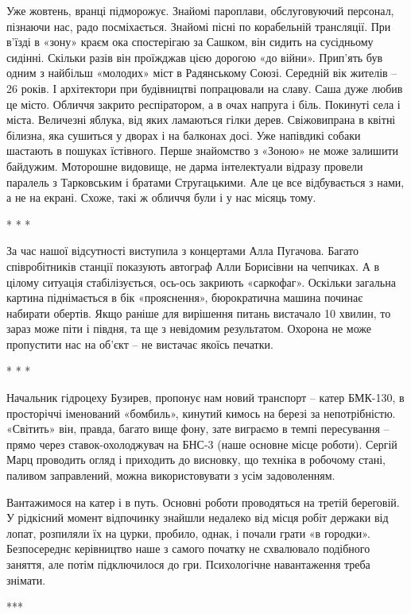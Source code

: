Уже жовтень, вранці підморожує. Знайомі пароплави, обслуговуючий персонал,
пізнаючи нас, радо посміхається. Знайомі пісні по корабельній трансляції. При
в'їзді в «зону» краєм ока спостерігаю за Сашком, він сидить на сусідньому
сидінні. Скільки разів він проїжджав цією дорогою «до війни». Прип'ять був
одним з найбільш «молодих» міст в Радянському Союзі. Середній вік жителів – 26
років. І архітектори при будівництві попрацювали на славу. Саша дуже любив це
місто. Обличчя закрито респіратором, а в очах напруга і біль. Покинуті села і
міста. Величезні яблука, від яких ламаються гілки дерев. Свіжовипрана в квітні
білизна, яка сушиться у дворах і на балконах досі. Уже напівдикі собаки
шастають в пошуках їстівного. Перше знайомство з «Зоною» не може залишити
байдужим. Моторошне видовище, не дарма інтелектуали відразу провели паралель з
Тарковським і братами Стругацькими. Але це все відбувається з нами, а не на
екрані. Схоже, такі ж обличчя були і у нас місяць тому.

* * *

За час нашої відсутності виступила з концертами Алла Пугачова. Багато
співробітників станції показують автограф Алли Борисівни на чепчиках. А в
цілому ситуація стабілізується, ось-ось закриють «саркофаг». Оскільки загальна
картина піднімається в бік «прояснення», бюрократична машина починає набирати
обертів. Якщо раніше для вирішення питань вистачало 10 хвилин, то зараз може
піти і півдня, та ще з невідомим результатом. Охорона не може пропустити нас на
об'єкт – не вистачає якоїсь печатки.

* * *

Начальник гідроцеху Бузирев, пропонує нам новий транспорт – катер БМК-130, в
просторіччі іменований «бомбиль», кинутий кимось на березі за непотрібністю.
«Світить» він, правда, багато вище фону, зате виграємо в темпі пересування –
прямо через ставок-охолоджувач на БНС-3 (наше основне місце роботи). Сергій
Марц проводить огляд і приходить до висновку, що техніка в робочому стані,
паливом заправлений, можна використовувати з усім задоволенням.

Вантажимося на катер і в путь. Основні роботи проводяться на третій береговій.
У рідкісний момент відпочинку знайшли недалеко від місця робіт держаки від
лопат, розпиляли їх на цурки, пробило, однак, і почали грати «в городки».
Безпосереднє керівництво наше з самого початку не схвалювало подібного заняття,
але потім підключилося до гри. Психологічне навантаження треба знімати.

***

